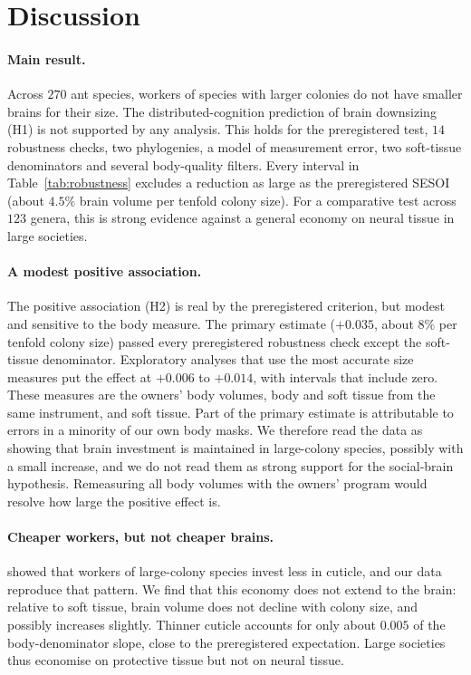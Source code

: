 \documentclass[11pt]{article}
\begin{document}
\section{Discussion}\label{sec:discussion}

\paragraph{Main result.} Across $270$ ant species, workers of species with larger colonies do not have smaller brains
for their size. The distributed-cognition prediction of brain downsizing (H1) is not supported by any analysis. This
holds for the preregistered test, $14$ robustness checks, two phylogenies, a model of measurement error, two
soft-tissue denominators and several body-quality filters. Every interval in Table~\ref{tab:robustness} excludes a
reduction as large as the preregistered SESOI (about $4.5\%$ brain volume per tenfold colony size). For a comparative
test across $123$ genera, this is strong evidence against a general economy on neural tissue in large societies.

\paragraph{A modest positive association.} The positive association (H2) is real by the preregistered criterion, but
modest and sensitive to the body measure. The primary estimate ($+0.035$, about $8\%$ per tenfold colony size) passed
every preregistered robustness check except the soft-tissue denominator. Exploratory analyses that use the most
accurate size measures put the effect at $+0.006$ to $+0.014$, with intervals that include zero. These measures are
the owners' body volumes, body and soft tissue from the same instrument, and soft tissue. Part of the primary estimate
is attributable to errors in a minority of our own body masks. We therefore read the data as showing that brain
investment is maintained in large-colony species, possibly with a small increase, and we do not read them as strong
support for the social-brain hypothesis. Remeasuring all body volumes with the owners' program
would resolve how large the positive effect is.

\paragraph{Cheaper workers, but not cheaper brains.} \citet{matte2025} showed that workers of large-colony species
invest less in cuticle, and our data reproduce that pattern. We find that this economy does not extend to the brain:
relative to soft tissue, brain volume does not decline with colony size, and possibly increases slightly. Thinner
cuticle accounts for only about $0.005$ of the body-denominator slope, close to the preregistered expectation. Large
societies thus economise on protective tissue but not on neural tissue.
\end{document}
